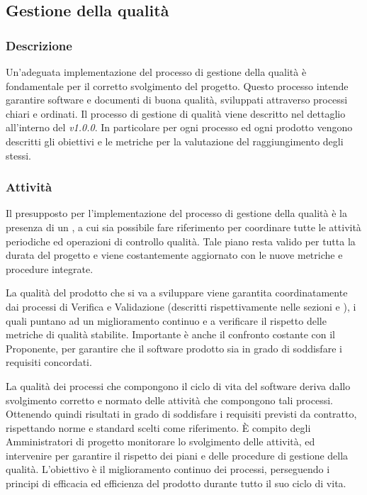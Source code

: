 \subsection{Gestione della qualità}
    \subsubsection{Descrizione}
      Un'adeguata implementazione del processo di gestione della qualità è fondamentale per il corretto svolgimento del progetto. Questo processo intende garantire software e documenti di buona qualità, sviluppati attraverso processi chiari e ordinati. Il processo di gestione di qualità viene descritto nel dettaglio all'interno del \textit{\PdQ{} v1.0.0}. In particolare per ogni processo ed ogni prodotto vengono descritti gli obiettivi e le metriche per la valutazione del raggiungimento degli stessi.
      
    \subsubsection{Attività}
       Il presupposto per l'implementazione del processo di gestione della qualità è la presenza di un \PdQ{}, a cui sia possibile fare riferimento per coordinare tutte le attività periodiche ed operazioni di controllo qualità. Tale piano resta valido per tutta la durata del progetto e viene costantemente aggiornato con le nuove metriche e procedure integrate.

      La qualità del prodotto che si va a sviluppare viene garantita coordinatamente dai processi di Verifica e Validazione (descritti rispettivamente nelle sezioni  e ), i quali puntano ad un miglioramento continuo e a verificare il rispetto delle metriche di qualità stabilite. Importante è anche il confronto costante con il Proponente, per garantire che il software prodotto sia in grado di soddisfare i requisiti concordati.

      La qualità dei processi che compongono il ciclo di vita del software deriva dallo svolgimento corretto e normato delle attività che compongono tali processi. Ottenendo quindi risultati in grado di soddisfare i requisiti previsti da contratto, rispettando norme e standard scelti come riferimento. È compito degli Amministratori di progetto monitorare lo svolgimento delle attività, ed intervenire per garantire il rispetto dei piani e delle procedure di gestione della qualità.
      L'obiettivo è il miglioramento continuo dei processi, perseguendo i principi di efficacia ed efficienza del prodotto durante tutto il suo ciclo di vita.   
	
